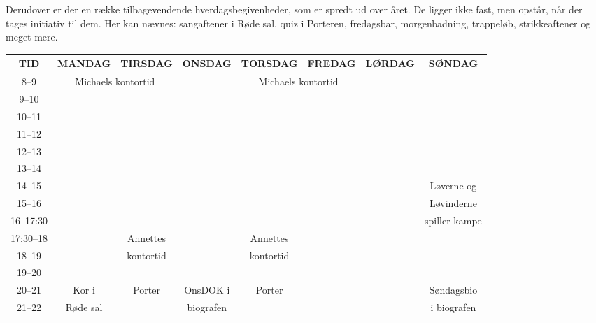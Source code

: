 \documentclass[11pt,article,twoside,openany,danish,extrafontsizes]{memoir} %
\begin{document}
Derudover er der en række tilbagevendende hverdagsbegivenheder, som er spredt ud over året. De ligger ikke fast, men opstår, når der tages initiativ til dem. Her kan nævnes: sangaftener i Røde sal, quiz i Porteren, fredagsbar, morgenbadning, trappeløb, strikkeaftener og meget mere.

\begin{landscape}
\begin{table}[p]
\begin{center}
\begin{tabular}{|>{\sffamily}c|c|c|c|c|c|c|c|}
\hline
\textsf{TID}		&	\textsf{MANDAG}	& \textsf{TIRSDAG}	& \textsf{ONSDAG}	& \textsf{TORSDAG}	& \textsf{FREDAG}	& \textsf{LØRDAG}	& \textsf{SØNDAG} \\ \hline
\rowcolor{SG-dark!10} 8--9	& \multicolumn{2}{|c|}{Michaels kontortid}	& & \multicolumn{2}{|c|}{Michaels kontortid} & & \\ \hline
\rowcolor{SG-dark!05} 9--10	& & & & & & & \\ \hline
\rowcolor{SG-dark!10} 10--11	& & & & & & & \\ \hline
\rowcolor{SG-dark!15} 11--12	& & & & & & & \\ \hline
\rowcolor{SG-dark!20} 12--13	& & & & & & & \\ \hline
\rowcolor{SG-dark!25} 13--14	& & & & & & & \\ \hline
\rowcolor{SG-dark!30} 14--15	& & & & & & & Løverne og \\ \cline{1-7}
\rowcolor{SG-dark!35} 15--16	& & & & & & & Løvinderne \\ \cline{1-7}
\rowcolor{SG-dark!40} 16--17:30	& & & & & & & spiller kampe \\ \hline
\rowcolor{SG-dark!45} 17:30--18	& & Annettes & & Annettes & & & \\ \cline{1-2} \cline{4-4} \cline{6-8}
\rowcolor{SG-dark!50} 18--19	& & kontortid & & kontortid & & & \\ \hline
\rowcolor{SG-dark!55} 19--20	& & & & & & & \\ \hline
\rowcolor{SG-dark!60} 20--21	& Kor i & Porter & OnsDOK i & Porter & & & Søndagsbio \\ \cline{1-1} \cline{6-8}
\rowcolor{SG-dark!65} 21--22	& Røde sal & & biografen & & & & i biografen \\ \hline
\end{tabular}
\end{center}
\end{table}
\end{landscape}
\end{document}

